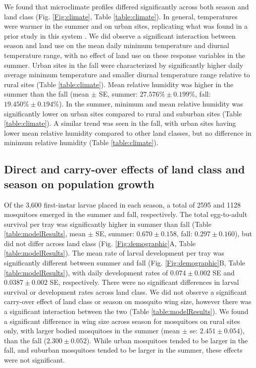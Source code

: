 \documentclass[doublespacing, linenumbers]{bmcart}
\begin{document}
We found that microclimate profiles differed significantly across both season and land class (Fig. \ref{Fig:climate}, Table \ref{table:climate}).
In general, temperatures were warmer in the summer and on urban sites, replicating what was found in a prior study in this system \cite{murdock2017}.
We did observe a significant interaction between season and land use on the mean daily minimum temperature and diurnal temperature range, with no effect of land use on these response variables in the summer.
Urban sites in the fall were characterized by significantly higher daily average minimum temperature and smaller diurnal temperature range relative to rural sites (Table \ref{table:climate}).
Mean relative humidity was higher in the summer than the fall (mean $\pm$ SE, summer: $27.576\% \pm 0.199\%$, fall: $19.450\% \pm 0.194\%$).
In the summer, minimum and mean relative humidity was significantly lower on urban sites compared to rural and suburban sites (Table \ref{table:climate}).
A similar trend was seen in the fall, with urban sites having lower mean relative humidity compared to other land classes, but no difference in minimum relative humidity (Table \ref{table:climate}).

\subsection*{Direct and carry-over effects of land class and season on population growth}

Of the 3,600 first-instar larvae placed in each season, a total of 2595 and 1128 mosquitoes emerged in the summer and fall, respectively.
The total egg-to-adult survival per tray was significantly higher in summer than fall (Table \ref{table:modelResults}, mean $\pm$ SE, summer: $0.670 \pm 0.158$, fall: $0.297 \pm 0.160$), but did not differ across land class (Fig. \ref{Fig:demographic}A, Table \ref{table:modelResults}).
The mean rate of larval development per tray was significantly different between summer and fall (Fig. \ref{Fig:demographic}B, Table \ref{table:modelResults}), with daily development rates of $0.074 \pm 0.002$ SE and $0.0387 \pm 0.002$ SE, respectively.
There were no significant differences in larval survival or development rates across land class.
We did not observe a significant carry-over effect of land class or season on mosquito wing size, however there was a significant interaction between the two (Table \ref{table:modelResults}).
We found a significant difference in wing size across season for mosquitoes on rural sites only, with larger bodied mosquitoes in the summer (mean $\pm$ se: $2.451 \pm 0.054$), than the fall ($2.300 \pm 0.052$).
While urban mosquitoes tended to be larger in the fall, and suburban mosquitoes tended to be larger in the summer, these effects were not significant.
\end{document}
